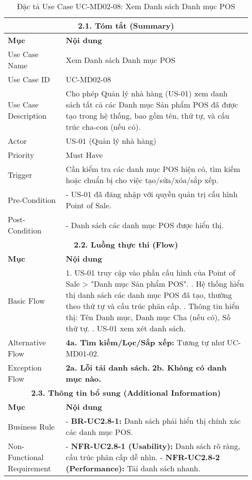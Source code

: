 \begin{longtable}{|m{4cm}|p{11cm}|}
\caption{Đặc tả Use Case UC-MD02-08: Xem Danh sách Danh mục POS} \label{tab:uc_md02_08_revised} \\
\hline
\multicolumn{2}{|c|}{\textbf{2.1. Tóm tắt (Summary)}} \\
\hline
\textbf{Mục} & \textbf{Nội dung} \\
\hline
\endhead %
\hline
\endfoot %
\hline
\endlastfoot %
Use Case Name & Xem Danh sách Danh mục POS \\
\hline
Use Case ID & UC-MD02-08 \\
\hline
Use Case Description & Cho phép Quản lý nhà hàng (US-01) xem danh sách tất cả các Danh mục Sản phẩm POS đã được tạo trong hệ thống, bao gồm tên, thứ tự, và cấu trúc cha-con (nếu có). \\
\hline
Actor & US-01 (Quản lý nhà hàng) \\
\hline
Priority & Must Have \\
\hline
Trigger & Cần kiểm tra các danh mục POS hiện có, tìm kiếm hoặc chuẩn bị cho việc tạo/sửa/xóa/sắp xếp. \\
\hline
Pre-Condition & - US-01 đã đăng nhập với quyền quản trị cấu hình Point of Sale. \\
\hline
Post-Condition & - Danh sách các danh mục POS được hiển thị. \\
\hline
\multicolumn{2}{|c|}{\textbf{2.2. Luồng thực thi (Flow)}} \\
\hline
\textbf{Mục} & \textbf{Nội dung} \\
\hline
Basic Flow & 1. US-01 truy cập vào phần cấu hình của Point of Sale > "Danh mục Sản phẩm POS". \newline 2. Hệ thống hiển thị danh sách các danh mục POS đã tạo, thường theo thứ tự và cấu trúc phân cấp. \newline 3. Thông tin hiển thị: Tên Danh mục, Danh mục Cha (nếu có), Số thứ tự. \newline 4. US-01 xem xét danh sách. \\
\hline
Alternative Flow & \textbf{4a. Tìm kiếm/Lọc/Sắp xếp:} Tương tự như UC-MD01-02. \\
\hline
Exception Flow & \textbf{2a. Lỗi tải danh sách.} \newline \textbf{2b. Không có danh mục nào.} \\
\hline
\multicolumn{2}{|c|}{\textbf{2.3. Thông tin bổ sung (Additional Information)}} \\
\hline
\textbf{Mục} & \textbf{Nội dung} \\
\hline
Business Rule & - \textbf{BR-UC2.8-1:} Danh sách phải hiển thị chính xác các danh mục POS. \\
\hline
Non-Functional Requirement & - \textbf{NFR-UC2.8-1 (Usability):} Danh sách rõ ràng, cấu trúc phân cấp dễ nhìn. \newline - \textbf{NFR-UC2.8-2 (Performance):} Tải danh sách nhanh. \\
\hline
\end{longtable}

